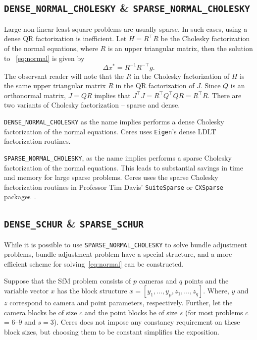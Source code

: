 \subsection{\texttt{DENSE\_NORMAL\_CHOLESKY} \& \texttt{SPARSE\_NORMAL\_CHOLESKY}}
Large non-linear least square problems are usually sparse. In such cases, using a dense QR factorization is inefficient. Let $H = R^\top R$ be the Cholesky factorization of the normal equations, where $R$ is an upper triangular matrix, then the  solution to ~\eqref{eq:normal} is given by
\begin{equation}
    \Delta x^* = R^{-1} R^{-\top} g.
\end{equation}
The observant reader will note that the $R$ in the Cholesky
factorization of $H$ is the same upper triangular matrix $R$ in the QR
factorization of $J$. Since $Q$ is an orthonormal matrix, $J=QR$
implies that $J^\top J = R^\top Q^\top Q R = R^\top R$. There are two variants of Cholesky factorization -- sparse and
dense.

\texttt{DENSE\_NORMAL\_CHOLESKY}  as the name implies performs a dense
Cholesky factorization of the normal equations. Ceres uses
\texttt{Eigen}'s dense LDLT factorization routines.

\texttt{SPARSE\_NORMAL\_CHOLESKY}, as the name implies performs a
sparse Cholesky factorization of the normal equations. This leads to
substantial savings in time and memory for large sparse
problems. Ceres uses the sparse Cholesky factorization routines in  Professor Tim Davis'  \texttt{SuiteSparse} or
\texttt{CXSparse} packages~\cite{chen2006acs}.

\subsection{\texttt{DENSE\_SCHUR} \& \texttt{SPARSE\_SCHUR}}
While it is possible to use \texttt{SPARSE\_NORMAL\_CHOLESKY} to solve bundle adjustment problems, bundle adjustment problem have a special structure, and a more efficient scheme for solving~\eqref{eq:normal} can be constructed.

Suppose that the SfM problem consists of $p$ cameras and $q$ points and the variable vector $x$ has the  block structure $x = [y_{1},\hdots,y_{p},z_{1},\hdots,z_{q}]$. Where, $y$ and $z$ correspond to camera and point parameters, respectively.  Further, let the camera blocks be of size $c$ and the point blocks be of size $s$ (for most problems $c$ =  $6$--$9$ and $s = 3$). Ceres does not impose any constancy requirement on these block sizes, but choosing them to be constant simplifies the exposition.

